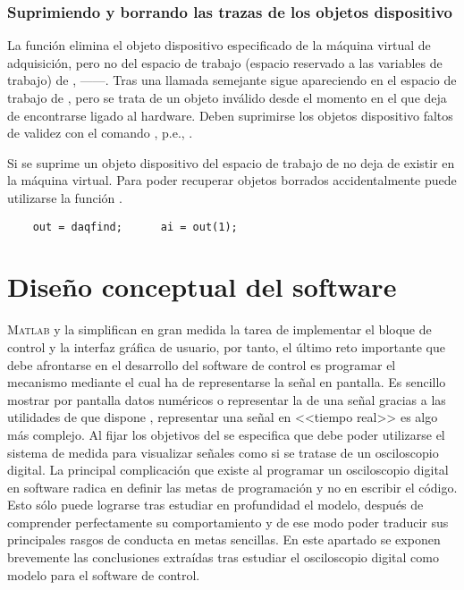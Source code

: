 \subsubsection{Suprimiendo y borrando las trazas de los objetos dispositivo}

La función  elimina el objeto dispositivo especificado de la
máquina virtual de adquisición, pero no del espacio de trabajo (espacio
reservado a las variables de trabajo) de \matlab{},
------. Tras una llamada semejante  sigue
apareciendo en el espacio de trabajo de \matlab{}, pero se trata de un
objeto inválido desde el momento en el que deja de encontrarse ligado al
hardware. Deben suprimirse los objetos dispositivo faltos de validez con el
comando , p.e., .

Si se suprime un objeto dispositivo del espacio de trabajo de \matlab{} no
deja de existir en la máquina virtual. Para poder recuperar objetos
borrados accidentalmente puede utilizarse la función .

\begin{lstlisting}
	out = daqfind;		ai = out(1);
\end{lstlisting}


\section{Diseño conceptual del software}\label{sec:softdesign}

\textsc{Matlab} y la \datx{} simplifican en gran medida la tarea de
implementar el bloque de control y la interfaz gráfica de usuario, por
tanto, el último reto importante que debe afrontarse en el desarrollo del
software de control es programar el mecanismo mediante el cual ha de
representarse la señal en pantalla. Es sencillo mostrar por pantalla datos
numéricos o representar la  de una señal gracias a las utilidades
de que dispone \matlab{}, representar una señal en <<tiempo real>> es algo
más complejo. Al fijar los objetivos del  se especifica que debe
poder utilizarse el sistema de medida para visualizar señales como si se
tratase de un osciloscopio digital. La principal complicación que existe al
programar un osciloscopio digital en software radica en definir las metas
de programación y no en escribir el código. Esto sólo puede lograrse tras
estudiar en profundidad el modelo, después de comprender perfectamente su
comportamiento y de ese modo poder traducir sus principales rasgos de
conducta en metas sencillas. En este apartado se exponen brevemente las
conclusiones extraídas tras estudiar el osciloscopio digital como modelo
para el software de control.


